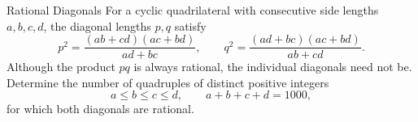 \begin{problem}{Rational Diagonals}
    For a cyclic quadrilateral with consecutive side lengths \(a,b,c,d\), the diagonal lengths \(p,q\) satisfy
    \[
    p^2=\frac{(ab+cd)(ac+bd)}{ad+bc},
    \qquad
    q^2=\frac{(ad+bc)(ac+bd)}{ab+cd}.
    \]
    Although the product \(pq\) is always rational, the individual diagonals need not be. Determine the number of quadruples of distinct positive integers
    \[
    a\le b\le c\le d,
    \qquad
    a+b+c+d=1000,
    \]
    for which both diagonals are rational.
\end{problem}
